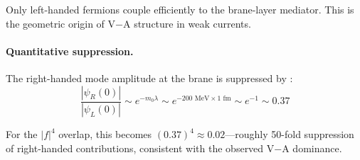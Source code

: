 Only left-handed fermions couple efficiently to the brane-layer mediator.
This is the geometric origin of V$-$A structure in weak currents.

\paragraph{Quantitative suppression.}
The right-handed mode amplitude at the brane is suppressed by \tagDc{}:
\begin{equation}
    \frac{|\psi_R(0)|}{|\psi_L(0)|} \sim e^{-m_0\lambda} \sim e^{-200 \text{ MeV} \times 1 \text{ fm}}
    \sim e^{-1} \sim 0.37
    \label{eq:ch11_chiral_suppression}
\end{equation}

For the $|f|^4$ overlap, this becomes $(0.37)^4 \approx 0.02$---roughly 50-fold
suppression of right-handed contributions, consistent with the observed
V$-$A dominance.


